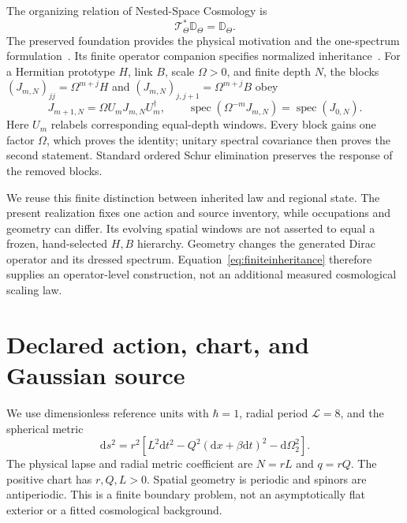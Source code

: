\documentclass[11pt]{article}
\newcommand{\dd}{\mathrm{d}}
\newcommand{\spec}{\operatorname{spec}}
\begin{document}
The organizing relation of Nested-Space Cosmology is
\begin{equation}\label{eq:inheritance}
\mathcal T_\Theta^*\mathbb D_\Theta=\mathbb D_\Theta.
\end{equation}
The preserved foundation provides the physical motivation and the
one-spectrum formulation~\cite{EkNSC2026}. Its finite operator companion
specifies normalized inheritance~\cite{EkNested2026}. For a Hermitian
prototype $H$, link $B$, scale $\Omega>0$, and finite depth $N$, the blocks
$(J_{m,N})_{jj}=\Omega^{m+j}H$ and
$(J_{m,N})_{j,j+1}=\Omega^{m+j}B$ obey
\begin{equation}\label{eq:finiteinheritance}
J_{m+1,N}=\Omega U_mJ_{m,N}U_m^\dagger,
\qquad
\spec(\Omega^{-m}J_{m,N})=\spec(J_{0,N}).
\end{equation}
Here $U_m$ relabels corresponding equal-depth windows. Every block gains
one factor $\Omega$, which proves the identity; unitary spectral covariance
then proves the second statement. Standard ordered Schur elimination
preserves the response of the removed blocks.

We reuse this finite distinction between inherited law and regional state.
The present realization fixes one action and source inventory, while
occupations and geometry can differ. Its evolving spatial windows are not
asserted to equal a frozen, hand-selected $H,B$ hierarchy. Geometry changes
the generated Dirac operator and its dressed spectrum. Equation~\eqref{eq:finiteinheritance}
therefore supplies an operator-level construction, not an additional
measured cosmological scaling law.

\section{Declared action, chart, and Gaussian source}\label{sec:model}
We use dimensionless reference units with $\hbar=1$, radial period
$\mathcal L=8$, and the spherical metric
\begin{equation}\label{eq:metric}
\dd s^2=r^2\left[L^2\dd t^2-Q^2(\dd x+\beta\dd t)^2-\dd\Omega_2^2\right].
\end{equation}
The physical lapse and radial metric coefficient are $N=rL$ and $q=rQ$.
The positive chart has $r,Q,L>0$. Spatial geometry is periodic and spinors
are antiperiodic. This is a finite boundary problem, not an asymptotically
flat exterior or a fitted cosmological background.
\end{document}
